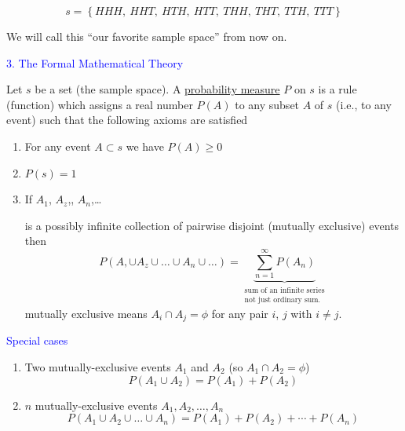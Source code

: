 \documentclass[landscape]{slides}
\begin{document}
\begin{slide}
$$
s=\left\{HHH, \ HHT, \ HTH, \ HTT, \ THH, \ THT, \ TTH, \ TTT\right\}
$$

We will call this ``our favorite sample space'' from now on.
\end{slide}

\begin{slide}
\textcolor{blue}{\large{3. The Formal Mathematical Theory}}

Let $s$ be a set (the sample space). A \underline{probability measure} $P$ on $s$ is a rule (function) which assigns a real number $P(A)$ to any subset $A$ of $s$ (i.e., to any event) such that the following axioms are satisfied
\begin{enumerate}
\item For any event $A\subset s$ we have $P(A)\geq 0$

\item $P(s)=1$
\end{enumerate}
\end{slide}

\begin{slide}
\begin{enumerate}
\setcounter{enumi}{2}
\item If $A_{1}$, $A_{z}$,\quad, $A_{n}$,\ldots

is a possibly infinite collection of pairwise disjoint (mutually exclusive) events then 
$$
P\left(A,\cup A_{z}\cup\ldots\cup A_{n}\cup \ldots\right)=\underbrace{\sum\limits^{\infty}_{n=1}P(A_{n})}_{\substack{\text{sum of an infinite series}\\ \text{not just ordinary sum.}}}
$$
mutually exclusive means $A_{i}\cap A_{j}=\phi$ for any pair $i$, $j$ with $i\neq j$.
\end{enumerate}
\end{slide}

\begin{slide}
\textcolor{blue}{\large{Special cases}}
\begin{enumerate}
\item Two mutually-exclusive events $A_{1}$ and $A_{2}$ (so $A_{1}\cap A_{2}=\phi$)
$$
P(A_{1}\cup A_{2})=P(A_{1})+P(A_{2})
$$

\item $n$ mutually-exclusive events $A_{1},A_{2},\ldots,A_{n}$
$$
P(A_{1}\cup A_{2}\cup\ldots\cup A_{n})=P(A_{1})+P(A_{2})+\cdots+P(A_{n})
$$
\end{enumerate}
\end{slide}
\end{document}
